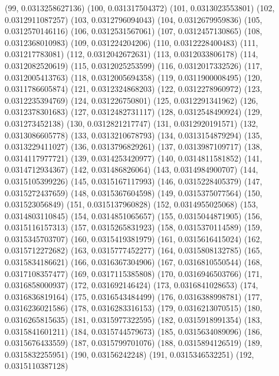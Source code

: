 {					(99, 0.0313258627136)
					(100, 0.031317504372)
					(101, 0.0313023553801)
					(102, 0.0312911087257)
					(103, 0.0312796094043)
					(104, 0.0312679959836)
					(105, 0.0312570146116)
					(106, 0.0312531567061)
					(107, 0.0312457130865)
					(108, 0.0312368010983)
					(109, 0.031224204206)
					(110, 0.0312228400483)
					(111, 0.031217783081)
					(112, 0.0312042672631)
					(113, 0.0312033806178)
					(114, 0.0312082520619)
					(115, 0.0312025253599)
					(116, 0.0312017332526)
					(117, 0.0312005413763)
					(118, 0.0312005694358)
					(119, 0.0311900008495)
					(120, 0.0311786605874)
					(121, 0.0312324868203)
					(122, 0.0312278960972)
					(123, 0.0312235394769)
					(124, 0.031226750801)
					(125, 0.0312291341962)
					(126, 0.0312378301683)
					(127, 0.0312482731117)
					(128, 0.0312548490924)
					(129, 0.031273452138)
					(130, 0.0312821217747)
					(131, 0.0312920191571)
					(132, 0.0313086605778)
					(133, 0.0313210678793)
					(134, 0.0313154879294)
					(135, 0.0313229411027)
					(136, 0.0313796829261)
					(137, 0.0313987109717)
					(138, 0.0314117977721)
					(139, 0.0314253420977)
					(140, 0.0314811581852)
					(141, 0.0314712934367)
					(142, 0.031486826064)
					(143, 0.0314984900707)
					(144, 0.0315105399226)
					(145, 0.0315167117993)
					(146, 0.0315228405379)
					(147, 0.0315272437659)
					(148, 0.0315367604598)
					(149, 0.0315375077564)
					(150, 0.031523056849)
					(151, 0.0315137960828)
					(152, 0.0314955025068)
					(153, 0.0314803110845)
					(154, 0.0314851065657)
					(155, 0.0315044871905)
					(156, 0.0315116157313)
					(157, 0.0315265831923)
					(158, 0.0315370114589)
					(159, 0.0315345703707)
					(160, 0.0315419381979)
					(161, 0.0315616415024)
					(162, 0.0315712272682)
					(163, 0.0315777452277)
					(164, 0.0315808132785)
					(165, 0.0315834186621)
					(166, 0.0316367304906)
					(167, 0.0316810550544)
					(168, 0.0317108357477)
					(169, 0.0317115385808)
					(170, 0.0316946503766)
					(171, 0.0316858000937)
					(172, 0.031692146424)
					(173, 0.0316841028653)
					(174, 0.0316836819164)
					(175, 0.0316543484499)
					(176, 0.0316388998781)
					(177, 0.0316236021586)
					(178, 0.0316283316153)
					(179, 0.0316213070515)
					(180, 0.0316265815635)
					(181, 0.0315977322595)
					(182, 0.0315918991354)
					(183, 0.0315841601211)
					(184, 0.0315744579673)
					(185, 0.0315634089096)
					(186, 0.0315676433559)
					(187, 0.0315799701076)
					(188, 0.0315894126519)
					(189, 0.0315832255951)
					(190, 0.03156242248)
					(191, 0.0315346532251)
					(192, 0.0315110387128)
}
